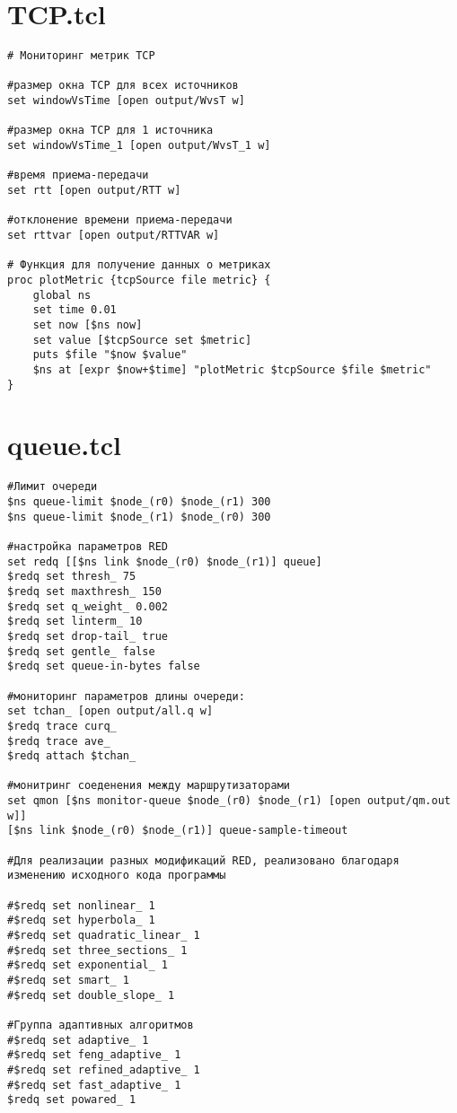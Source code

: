 \section*{TCP.tcl}
\label{app1:sec3}
\begin{verbatim}
# Мониторинг метрик TCP

#размер окна TCP для всех источников
set windowVsTime [open output/WvsT w]

#размер окна TCP для 1 источника 
set windowVsTime_1 [open output/WvsT_1 w]

#время приема-передачи
set rtt [open output/RTT w]

#отклонение времени приема-передачи 
set rttvar [open output/RTTVAR w]

# Функция для получение данных о метриках
proc plotMetric {tcpSource file metric} {
    global ns
    set time 0.01
    set now [$ns now]
    set value [$tcpSource set $metric]
    puts $file "$now $value"
    $ns at [expr $now+$time] "plotMetric $tcpSource $file $metric"
}
\end{verbatim}

\section*{queue.tcl}
\label{app1:sec4}
\begin{verbatim}
#Лимит очереди
$ns queue-limit $node_(r0) $node_(r1) 300
$ns queue-limit $node_(r1) $node_(r0) 300

#настройка параметров RED
set redq [[$ns link $node_(r0) $node_(r1)] queue]
$redq set thresh_ 75 
$redq set maxthresh_ 150
$redq set q_weight_ 0.002
$redq set linterm_ 10
$redq set drop-tail_ true
$redq set gentle_ false
$redq set queue-in-bytes false

#мониторинг параметров длины очереди:
set tchan_ [open output/all.q w]
$redq trace curq_
$redq trace ave_
$redq attach $tchan_

#монитринг соеденения между маршрутизаторами
set qmon [$ns monitor-queue $node_(r0) $node_(r1) [open output/qm.out w]] 
[$ns link $node_(r0) $node_(r1)] queue-sample-timeout

#Для реализации разных модификаций RED, реализовано благодаря изменению исходного кода программы

#$redq set nonlinear_ 1
#$redq set hyperbola_ 1 
#$redq set quadratic_linear_ 1
#$redq set three_sections_ 1
#$redq set exponential_ 1
#$redq set smart_ 1
#$redq set double_slope_ 1

#Группа адаптивных алгоритмов
#$redq set adaptive_ 1
#$redq set feng_adaptive_ 1
#$redq set refined_adaptive_ 1
#$redq set fast_adaptive_ 1
$redq set powared_ 1
\end{verbatim}

